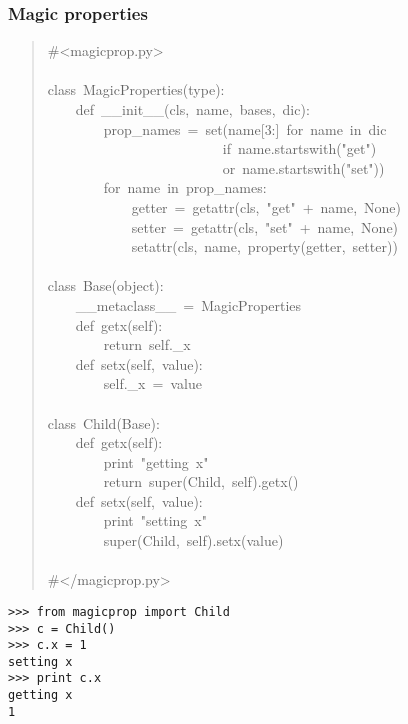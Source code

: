 \documentclass[10pt,a4paper,english]{article}
\begin{document}
\subsubsection*{Magic properties}
\begin{quote}{\ttfamily \raggedright \noindent
{\#}<magicprop.py>~\\
~\\
class~MagicProperties(type):~\\
~~~~def~{\_}{\_}init{\_}{\_}(cls,~name,~bases,~dic):~\\
~~~~~~~~prop{\_}names~=~set(name{[}3:]~for~name~in~dic~\\
~~~~~~~~~~~~~~~~~~~~~~~~~if~name.startswith("get")~\\
~~~~~~~~~~~~~~~~~~~~~~~~~or~name.startswith("set"))~\\
~~~~~~~~for~name~in~prop{\_}names:~\\
~~~~~~~~~~~~getter~=~getattr(cls,~"get"~+~name,~None)~\\
~~~~~~~~~~~~setter~=~getattr(cls,~"set"~+~name,~None)~\\
~~~~~~~~~~~~setattr(cls,~name,~property(getter,~setter))~\\
~\\
class~Base(object):~\\
~~~~{\_}{\_}metaclass{\_}{\_}~=~MagicProperties~\\
~~~~def~getx(self):~\\
~~~~~~~~return~self.{\_}x~\\
~~~~def~setx(self,~value):~\\
~~~~~~~~self.{\_}x~=~value~\\
~\\
class~Child(Base):~\\
~~~~def~getx(self):~\\
~~~~~~~~print~"getting~x"~\\
~~~~~~~~return~super(Child,~self).getx()~~\\
~~~~def~setx(self,~value):~\\
~~~~~~~~print~"setting~x"~\\
~~~~~~~~super(Child,~self).setx(value)~~\\
~\\
{\#}</magicprop.py>
}\end{quote}
\begin{verbatim}>>> from magicprop import Child
>>> c = Child()
>>> c.x = 1
setting x
>>> print c.x
getting x
1\end{verbatim}


\end{document}
